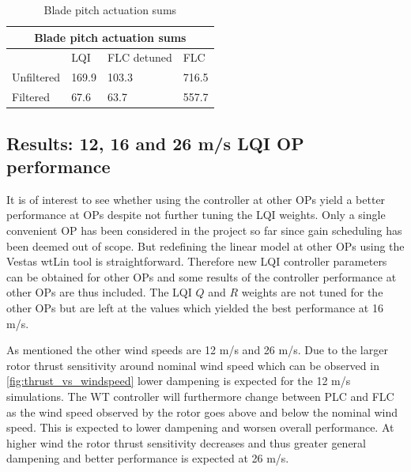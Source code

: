 \begin{table}[t]
	\centering
	\caption{Blade pitch actuation sums}
	\label{tab:pitch_sum}
	\begin{tabular}{@{}|llll|@{}}
		\toprule
		\multicolumn{4}{|c|}{Blade pitch actuation sums}                                                                                                   \\ \midrule
		\multicolumn{1}{|l|}{}           & \multicolumn{1}{l|}{LQI}   & \multicolumn{1}{l|}{FLC detuned}                   & FLC                           \\ \midrule
		\multicolumn{1}{|l|}{Unfiltered} & \multicolumn{1}{l|}{169.9} & \multicolumn{1}{l|}{\cellcolor[HTML]{9AFF99}103.3} & \cellcolor[HTML]{FFCCC9}716.5 \\ \midrule
		\multicolumn{1}{|l|}{Filtered}   & \multicolumn{1}{l|}{67.6}  & \multicolumn{1}{l|}{\cellcolor[HTML]{9AFF99}63.7}  & \cellcolor[HTML]{FFCCC9}557.7 \\ \bottomrule
	\end{tabular}
\end{table}

\subsection{Results: 12, 16 and 26 m/s LQI OP performance} \label{sec:test_vts_part2}
It is of interest to see whether using the controller at other OPs yield a better performance at OPs despite not further tuning the LQI weights. Only a single convenient OP has been considered in the project so far since gain scheduling has been deemed out of scope. But redefining the linear model at other OPs using the Vestas wtLin tool is straightforward. Therefore new LQI controller parameters can be obtained for other OPs and some results of the controller performance at other OPs are thus included. The LQI $ Q $ and $ R $ weights are not tuned for the other OPs but are left at the values which yielded the best performance at 16 m/s.

As mentioned the other wind speeds are 12 m/s and 26 m/s. Due to the larger rotor thrust sensitivity around nominal wind speed which can be observed in \cref{fig:thrust_vs_windspeed} lower dampening is expected for the 12 m/s simulations. The WT controller will furthermore change between PLC and FLC as the wind speed observed by the rotor goes above and below the nominal wind speed. This is expected to lower dampening and worsen overall performance. At higher wind the rotor thrust sensitivity decreases and thus greater general dampening and better performance is expected at 26 m/s.

